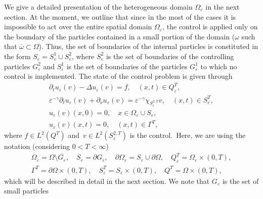 \documentclass[10pt,a4paper]{amsart}
\numberwithin{equation}{section}
\begin{document}
 We give a detailed presentation of the heterogeneous domain $\Omega
_{\varepsilon }$ in the next section. At the moment, we outline that
since in the most of the cases it is impossible to act over the
entire spatial domain $\Omega _{\varepsilon }$, the control is applied only
on the boundary of the particles contained in a small portion of the domain
($\omega $ such that $\overline{\omega }\subset \Omega $).
Thus, the set of boundaries of the internal particles is constituted in the form
$S_{\varepsilon }=S_{\varepsilon }^{1}\cup S_{\varepsilon }^2$, where
$S_{\varepsilon }^2$ is the set of boundaries of the controlling particles
$G_{\varepsilon }^2$ and $S_{\varepsilon }^{1}$ is the set of boundaries of
the particles $G_{\varepsilon }^{1}$ to which no control is implemented. The
state of the control problem is given through
\begin{equation}
\begin{gathered}
\partial _{t}u_{\varepsilon }(v)-\Delta u_{\varepsilon }(v)=f, \quad
 (x,t)\in Q_{\varepsilon }^{T}, \\
\varepsilon ^{-\gamma }\partial _{t}u_{\varepsilon }(v)+\partial _{\nu
}u_{\varepsilon }(v)=\varepsilon ^{-\gamma }\chi _{S_{\varepsilon }^{2,T}}v,
\quad (x,t)\in S_{\varepsilon }^{T}, \\
u_{\varepsilon }(v)(x,0)=0, \quad x\in \Omega _{\varepsilon }\cup
S_{\varepsilon }, \\
u_{\varepsilon }(v)(x,t)=0, \quad (x,t)\in \Gamma ^{T},%
\end{gathered}  \label{init state prob}
\end{equation}
where $f\in L^2(Q^{T})$ and\textrm{\ }$v\in L^2(S_{\varepsilon }^{2,T})$
is the control.\textrm{\ }Here, we are using the notation
(considering $0<T<\infty $)
\begin{equation}
\begin{gathered}
\Omega _{\varepsilon }=\Omega \setminus \overline{G_{\varepsilon }}, \quad
S_{\varepsilon }=\partial G_{\varepsilon }, \quad
\partial \Omega _{\varepsilon }=S_{\varepsilon }\cup \partial \Omega ,   \quad
Q_{\varepsilon }^{T}=\Omega _{\varepsilon }\times (0,T), \\
\Gamma^{T}=\partial \Omega \times (0,T), \quad
S_{\varepsilon }^{T}=S_{\varepsilon }\times (0,T), \quad Q^{T}=\Omega \times (0,T),
\end{gathered}
\label{def: basic sets}
\end{equation}
which will be described in detail in the next section. We note that
$G_{\varepsilon }$ is the set of small particles
\end{document}
